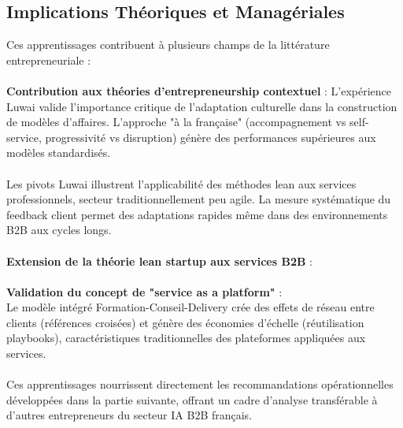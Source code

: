 \subsection{Implications Théoriques et Managériales}

Ces apprentissages contribuent à plusieurs champs de la littérature entrepreneuriale :
\\\\
\textbf{Contribution aux théories d'entrepreneurship contextuel} \cite{welter2011contextualizing} :
L'expérience Luwai valide l'importance critique de l'adaptation culturelle dans la construction de modèles d'affaires. L'approche "à la française" (accompagnement vs self-service, progressivité vs disruption) génère des performances supérieures aux modèles standardisés.
\\\\
Les pivots Luwai illustrent l'applicabilité des méthodes lean aux services professionnels, secteur traditionnellement peu agile. La mesure systématique du feedback client permet des adaptations rapides même dans des environnements B2B aux cycles longs.
\\\\
\textbf{Extension de la théorie lean startup aux services B2B} \cite{ries2011lean} :
\\\\
\textbf{Validation du concept de "service as a platform"} \cite{parker2016platform} :\\
Le modèle intégré Formation-Conseil-Delivery crée des effets de réseau entre clients (références croisées) et génère des économies d'échelle (réutilisation playbooks), caractéristiques traditionnelles des plateformes appliquées aux services.
\\\\
Ces apprentissages nourrissent directement les recommandations opérationnelles développées dans la partie suivante, offrant un cadre d'analyse transférable à d'autres entrepreneurs du secteur IA B2B français.